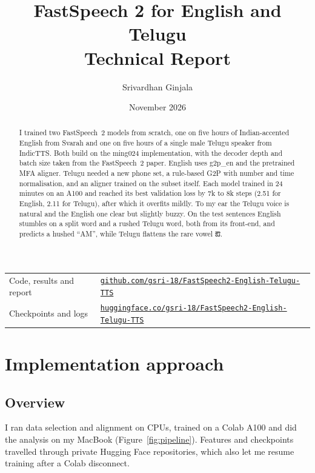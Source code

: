 \documentclass[11pt,a4paper]{article}
\title{\textbf{FastSpeech 2 for English and Telugu}\\[2pt]\large Technical Report}
\author{Srivardhan Ginjala}
\date{November 2026}
\newcommand{\te}[1]{{\telugufont #1}}
\begin{document}
\maketitle

\begin{center}\small
\begin{tabular}{ll}
Code, results and report & \href{https://github.com/gsri-18/FastSpeech2-English-Telugu-TTS}{\texttt{github.com/gsri-18/FastSpeech2-English-Telugu-TTS}} \\
Checkpoints and logs & \href{https://huggingface.co/gsri-18/FastSpeech2-English-Telugu-TTS}{\texttt{huggingface.co/gsri-18/FastSpeech2-English-Telugu-TTS}} \\
\end{tabular}
\end{center}

\begin{abstract}
\noindent I trained two FastSpeech~2 models from scratch, one on five hours of Indian-accented English from
Svarah and one on five hours of a single male Telugu speaker from IndicTTS. Both build on the ming024
implementation, with the decoder depth and batch size taken from the FastSpeech~2 paper. English uses g2p\_en and
the pretrained MFA aligner. Telugu needed a new phone set, a rule-based G2P with number and time normalisation,
and an aligner trained on the subset itself. Each model trained in 24 minutes on an A100 and reached its best
validation loss by 7k to 8k steps (2.51 for English, 2.11 for Telugu), after which it overfits mildly. To my ear
the Telugu voice is natural and the English one clear but slightly buzzy. On the test sentences
English stumbles on a split word and a rushed Telugu word, both from its front-end, and
predicts a hushed “AM”, while Telugu flattens the rare vowel \te{ఔ}.
\end{abstract}

\tableofcontents

\section{Implementation approach}

\subsection{Overview}
I ran data selection and alignment on CPUs, trained on a Colab A100 and did the analysis on my MacBook
(Figure~\ref{fig:pipeline}). Features and checkpoints travelled through private Hugging Face repositories, which
also let me resume training after a Colab disconnect.
\end{document}
